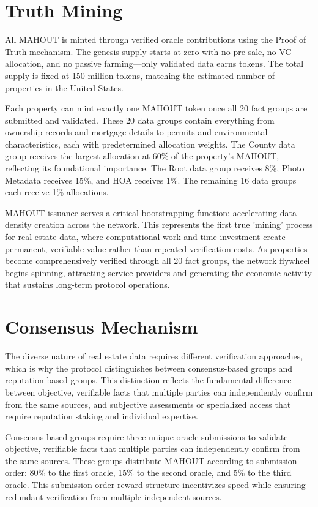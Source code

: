 \section{Truth Mining}

All MAHOUT is minted through verified oracle contributions using the Proof of Truth mechanism. The genesis supply starts at zero with no pre-sale, no VC allocation, and no passive farming---only validated data earns tokens. The total supply is fixed at 150 million tokens, matching the estimated number of properties in the United States.

Each property can mint exactly one MAHOUT token once all 20 fact groups are submitted and validated. These 20 data groups contain everything from ownership records and mortgage details to permits and environmental characteristics, each with predetermined allocation weights. The County data group receives the largest allocation at 60\% of the property's MAHOUT, reflecting its foundational importance. The Root data group receives 8\%, Photo Metadata receives 15\%, and HOA receives 1\%. The remaining 16 data groups each receive 1\% allocations.

MAHOUT issuance serves a critical bootstrapping function: accelerating data density creation across the network. This represents the first true 'mining' process for real estate data, where computational work and time investment create permanent, verifiable value rather than repeated verification costs. As properties become comprehensively verified through all 20 fact groups, the network flywheel begins spinning, attracting service providers and generating the economic activity that sustains long-term protocol operations.

\section{Consensus Mechanism}

The diverse nature of real estate data requires different verification approaches, which is why the protocol distinguishes between consensus-based groups and reputation-based groups. This distinction reflects the fundamental difference between objective, verifiable facts that multiple parties can independently confirm from the same sources, and subjective assessments or specialized access that require reputation staking and individual expertise.

Consensus-based groups require three unique oracle submissions to validate objective, verifiable facts that multiple parties can independently confirm from the same sources. These groups distribute MAHOUT according to submission order: 80\% to the first oracle, 15\% to the second oracle, and 5\% to the third oracle. This submission-order reward structure incentivizes speed while ensuring redundant verification from multiple independent sources.

